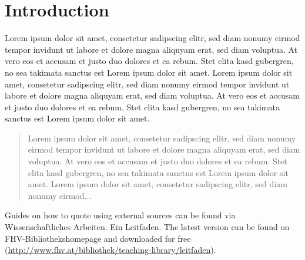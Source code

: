 \chapter{Introduction}
Lorem ipsum dolor sit amet, consetetur sadipscing elitr, sed diam nonumy
eirmod tempor invidunt ut labore et dolore magna aliquyam erat, sed diam
voluptua. At vero eos et accusam et justo duo dolores et ea rebum. Stet
clita kasd gubergren, no sea takimata sanctus est Lorem ipsum dolor sit
amet. Lorem ipsum dolor sit amet, consetetur sadipscing elitr, sed diam
nonumy eirmod tempor invidunt ut labore et dolore magna aliquyam erat, sed
diam voluptua. At vero eos et accusam et justo duo dolores et ea rebum.
Stet clita kasd gubergren, no sea takimata sanctus est Lorem ipsum dolor
sit amet.

\begin{quote}

    Lorem ipsum dolor sit amet, consetetur sadipscing elitr, sed diam
    nonumy eirmod tempor invidunt ut labore et dolore magna aliquyam erat,
    sed diam voluptua. At vero eos et accusam et justo duo dolores et ea
    rebum. Stet clita kasd gubergren, no sea takimata sanctus est Lorem
    ipsum dolor sit amet. Lorem ipsum dolor sit amet, consetetur sadipscing
    elitr, sed diam nonumy eirmod...

\end{quote}

Guides on how to quote using external sources can be found via  \glqq
Wissenschaftliches Arbeiten. Ein Leitfaden\grqq. The latest version can be
found on FHV-Bibliothekshomepage and downloaded for free
(\href{http://www.fhv.at/bibliothek/teaching-library/leitfaden}{http://www.fhv.at/bibliothek/teaching-library/leitfaden}).
